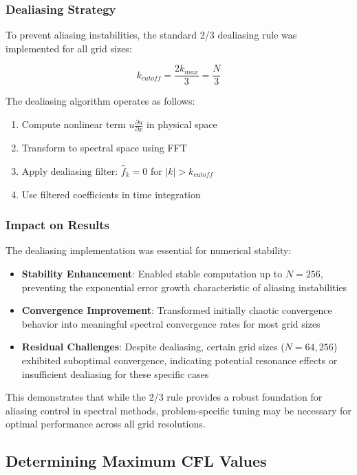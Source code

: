 \subsubsection{Dealiasing Strategy}
To prevent aliasing instabilities, the standard 2/3 dealiasing rule was implemented for all grid sizes:

\begin{equation}
	k_{cutoff} = \frac{2k_{max}}{3} = \frac{N}{3}
\end{equation}

The dealiasing algorithm operates as follows:
\begin{enumerate}
	\item Compute nonlinear term $u\frac{\partial u}{\partial x}$ in physical space
	\item Transform to spectral space using FFT
	\item Apply dealiasing filter: $\hat{f}_k = 0$ for $|k| > k_{cutoff}$
	\item Use filtered coefficients in time integration
\end{enumerate}

\subsubsection{Impact on Results}
The dealiasing implementation was essential for numerical stability:

\begin{itemize}
	\item \textbf{Stability Enhancement}: Enabled stable computation up to $N = 256$, preventing the exponential error growth characteristic of aliasing instabilities
	\item \textbf{Convergence Improvement}: Transformed initially chaotic convergence behavior into meaningful spectral convergence rates for most grid sizes
	\item \textbf{Residual Challenges}: Despite dealiasing, certain grid sizes ($N = 64, 256$) exhibited suboptimal convergence, indicating potential resonance effects or insufficient dealiasing for these specific cases
\end{itemize}

This demonstrates that while the 2/3 rule provides a robust foundation for aliasing control in spectral methods, problem-specific tuning may be necessary for optimal performance across all grid resolutions.

\subsection{Determining Maximum CFL Values}

